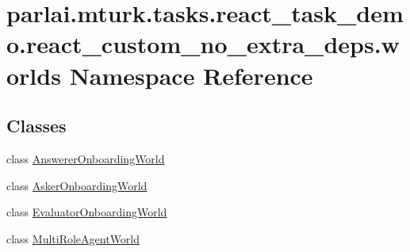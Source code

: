 \hypertarget{namespaceparlai_1_1mturk_1_1tasks_1_1react__task__demo_1_1react__custom__no__extra__deps_1_1worlds}{}\section{parlai.\+mturk.\+tasks.\+react\+\_\+task\+\_\+demo.\+react\+\_\+custom\+\_\+no\+\_\+extra\+\_\+deps.\+worlds Namespace Reference}
\label{namespaceparlai_1_1mturk_1_1tasks_1_1react__task__demo_1_1react__custom__no__extra__deps_1_1worlds}
\subsection*{Classes}
\begin{DoxyCompactItemize}
\item 
class \hyperlink{classparlai_1_1mturk_1_1tasks_1_1react__task__demo_1_1react__custom__no__extra__deps_1_1worlds_1_1AnswererOnboardingWorld}{Answerer\+Onboarding\+World}
\item 
class \hyperlink{classparlai_1_1mturk_1_1tasks_1_1react__task__demo_1_1react__custom__no__extra__deps_1_1worlds_1_1AskerOnboardingWorld}{Asker\+Onboarding\+World}
\item 
class \hyperlink{classparlai_1_1mturk_1_1tasks_1_1react__task__demo_1_1react__custom__no__extra__deps_1_1worlds_1_1EvaluatorOnboardingWorld}{Evaluator\+Onboarding\+World}
\item 
class \hyperlink{classparlai_1_1mturk_1_1tasks_1_1react__task__demo_1_1react__custom__no__extra__deps_1_1worlds_1_1MultiRoleAgentWorld}{Multi\+Role\+Agent\+World}
\end{DoxyCompactItemize}
